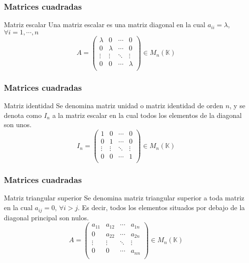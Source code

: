 \documentclass[12pt]{article}
\begin{document}
 
   \begin{frame}
  \frametitle{Matrices cuadradas}
   \begin{block}{Matriz escalar}
Una matriz escalar es una matriz diagonal en la cual $a_{ii} = \lambda$,  $\forall i = 1, \cdots, n $
\[ A =  \left(\begin{matrix} %
      \lambda & 0 & \cdots & 0 \\
      0 & \lambda & \cdots & 0 \\
  \vdots & \vdots & \ddots & \vdots \\
   0 & 0 & \cdots & \lambda \\
    \end{matrix}\right) \in M_{ n} (\mathbb{K})\]
  \end{block}
 \end{frame}
 
 



 \begin{frame}
  \frametitle{Matrices cuadradas}
   \begin{block}{Matriz identidad}
Se denomina matriz unidad o matriz identidad de orden $n$, y se denota como $I_n$ a la matriz escalar en la cual todos los elementos de la diagonal son unos. 
\[ I_n =  \left(\begin{matrix} %
      1 & 0 & \cdots & 0 \\
      0 & 1 & \cdots & 0 \\
  \vdots & \vdots & \ddots & \vdots \\
   0 & 0 & \cdots & 1 \\
    \end{matrix}\right) \in M_{ n} (\mathbb{K})\]
  \end{block}
 \end{frame}
 
 
 
  \begin{frame}
  \frametitle{Matrices cuadradas}
   \begin{block}{Matriz triangular superior}
Se denomina matriz triangular superior a toda matriz en la cual $a_{ij} = 0$,  $\forall i > j $. Es decir, todos los elementos situados por debajo de la diagonal principal son nulos. 
\[ A =  \left(\begin{matrix} %
      a_{11} & a_{12} & \cdots & a_{1n} \\
      0 & a_{22} & \cdots & a_{2n} \\
  \vdots & \vdots & \ddots & \vdots \\
   0 & 0 & \cdots & a_{nn} \\
    \end{matrix}\right) \in M_{ n} (\mathbb{K})\]
  \end{block}
 \end{frame}
\end{document}
